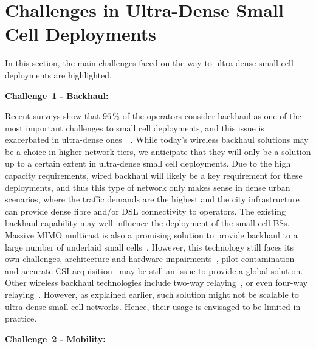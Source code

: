 \documentclass{IEEEtran}
\begin{document}
\section{Challenges in Ultra-Dense Small Cell Deployments}
\label{sec:Challenges}

In this section, the main challenges faced on the way to ultra-dense small cell deployments are highlighted.


{\bf Challenge~1 - Backhaul:}

Recent surveys show that 96\,\% of the operators consider backhaul as one of the most important challenges to small cell deployments,
and this issue is exacerbated in ultra-dense ones~\cite{2013Nicoll}~\cite{2014SCF}.
While today's wireless backhaul solutions may be a choice in higher network tiers,
we anticipate that they will only be a solution up to a certain extent in ultra-dense small cell deployments.
Due to the high capacity requirements,
wired backhaul will likely be a key requirement for these deployments,
and thus this type of network only makes sense in dense urban scenarios,
where the traffic demands are the highest and the city infrastructure can provide dense fibre and/or \ac{DSL} connectivity to operators.
The existing backhaul capability may well influence the deployment of the small cell \acp{BS}.
Massive \ac{MIMO} multicast is also a promising solution to provide backhaul to a large number of underlaid small cells~\cite{6736761}.
However, this technology still faces its own challenges,
architecture and hardware impairments~\cite{Gustavsson2014}, pilot contamination~\cite{5898372} and accurate \ac{CSI} acquisition~\cite{Truong2013} may be still an issue to provide a global solution.
Other wireless backhaul technologies include two-way relaying~\cite{two-way-relay},
or even four-way relaying~\cite{four-way-relay}.
However, as explained earlier,
such solution might not be scalable to ultra-dense small cell networks.
Hence, their usage is envisaged to be limited in practice.


{\bf Challenge~2 - Mobility:}
\end{document}
